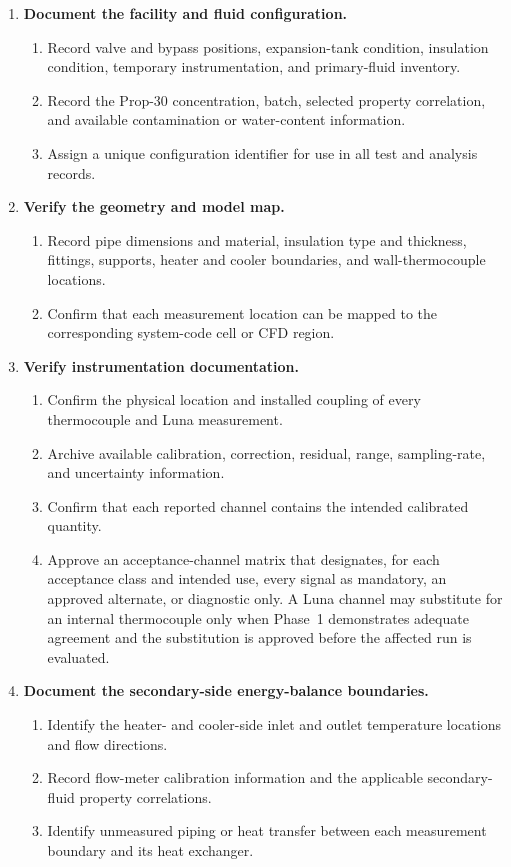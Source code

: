 \documentclass[11pt]{article}
\begin{document}
\begin{enumerate}
    \item \textbf{Document the facility and fluid configuration.}
    \begin{enumerate}
        \item Record valve and bypass positions, expansion-tank condition, insulation condition, temporary instrumentation, and primary-fluid inventory.
        \item Record the Prop-30 concentration, batch, selected property correlation, and available contamination or water-content information.
        \item Assign a unique configuration identifier for use in all test and analysis records.
    \end{enumerate}

    \item \textbf{Verify the geometry and model map.}
    \begin{enumerate}
        \item Record pipe dimensions and material, insulation type and thickness, fittings, supports, heater and cooler boundaries, and wall-thermocouple locations.
        \item Confirm that each measurement location can be mapped to the corresponding system-code cell or CFD region.
    \end{enumerate}

    \item \textbf{Verify instrumentation documentation.}
    \begin{enumerate}
        \item Confirm the physical location and installed coupling of every thermocouple and Luna measurement.
        \item Archive available calibration, correction, residual, range, sampling-rate, and uncertainty information.
        \item Confirm that each reported channel contains the intended calibrated quantity.
        \item Approve an acceptance-channel matrix that designates, for each acceptance class and intended use, every signal as mandatory, an approved alternate, or diagnostic only. A Luna channel may substitute for an internal thermocouple only when Phase~1 demonstrates adequate agreement and the substitution is approved before the affected run is evaluated.
    \end{enumerate}

    \item \textbf{Document the secondary-side energy-balance boundaries.}
    \begin{enumerate}
        \item Identify the heater- and cooler-side inlet and outlet temperature locations and flow directions.
        \item Record flow-meter calibration information and the applicable secondary-fluid property correlations.
        \item Identify unmeasured piping or heat transfer between each measurement boundary and its heat exchanger.
    \end{enumerate}


\end{enumerate}
\end{document}
